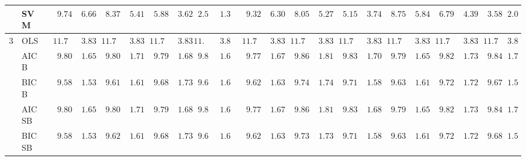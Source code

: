 \begin{tabular}{ll|ll|llllll|llllll|llllll}
 & SVM  & $\phantom{00}9.74$ & $\phantom{00}6.66$ & $\phantom{00}8.37$ & $\phantom{00}5.41$ & $\phantom{00}5.88$ & $\phantom{00}3.62$ & $\phantom{0}2.55$ & $\phantom{0}1.30$ & $\phantom{00}9.32$ & $\phantom{00}6.30$ & $\phantom{00}8.05$ & $\phantom{00}5.27$ & $\phantom{00}5.15$ & $\phantom{00}3.74$ & $\phantom{00}8.75$ & $\phantom{00}5.84$ & $\phantom{00}6.79$ & $\phantom{00}4.39$ & $\phantom{00}3.58$ & $\phantom{0}2.09$ \\\hline
3 & OLS  & $\phantom{0}11.70$ & $\phantom{00}3.83$ & $\phantom{0}11.70$ & $\phantom{00}3.83$ & $\phantom{0}11.70$ & $\phantom{00}3.83$ & $11.70$ & $\phantom{0}3.83$ & $\phantom{0}11.70$ & $\phantom{00}3.83$ & $\phantom{0}11.70$ & $\phantom{00}3.83$ & $\phantom{0}11.70$ & $\phantom{00}3.83$ & $\phantom{0}11.70$ & $\phantom{00}3.83$ & $\phantom{0}11.70$ & $\phantom{00}3.83$ & $\phantom{0}11.70$ & $\phantom{0}3.83$ \\
 & AIC B  & $\phantom{00}9.80$ & $\phantom{00}1.65$ & $\phantom{00}9.80$ & $\phantom{00}1.71$ & $\phantom{00}9.79$ & $\phantom{00}1.68$ & $\phantom{0}9.80$ & $\phantom{0}1.66$ & $\phantom{00}9.77$ & $\phantom{00}1.67$ & $\phantom{00}9.86$ & $\phantom{00}1.81$ & $\phantom{00}9.83$ & $\phantom{00}1.70$ & $\phantom{00}9.79$ & $\phantom{00}1.65$ & $\phantom{00}9.82$ & $\phantom{00}1.73$ & $\phantom{00}9.84$ & $\phantom{0}1.70$ \\
 & BIC B  & $\phantom{00}9.58$ & $\phantom{00}1.53$ & $\phantom{00}9.61$ & $\phantom{00}1.61$ & $\phantom{00}9.68$ & $\phantom{00}1.73$ & $\phantom{0}9.67$ & $\phantom{0}1.60$ & $\phantom{00}9.62$ & $\phantom{00}1.63$ & $\phantom{00}9.74$ & $\phantom{00}1.74$ & $\phantom{00}9.71$ & $\phantom{00}1.58$ & $\phantom{00}9.63$ & $\phantom{00}1.61$ & $\phantom{00}9.72$ & $\phantom{00}1.72$ & $\phantom{00}9.67$ & $\phantom{0}1.55$ \\
 & AIC SB  & $\phantom{00}9.80$ & $\phantom{00}1.65$ & $\phantom{00}9.80$ & $\phantom{00}1.71$ & $\phantom{00}9.79$ & $\phantom{00}1.68$ & $\phantom{0}9.80$ & $\phantom{0}1.66$ & $\phantom{00}9.77$ & $\phantom{00}1.67$ & $\phantom{00}9.86$ & $\phantom{00}1.81$ & $\phantom{00}9.83$ & $\phantom{00}1.68$ & $\phantom{00}9.79$ & $\phantom{00}1.65$ & $\phantom{00}9.82$ & $\phantom{00}1.73$ & $\phantom{00}9.84$ & $\phantom{0}1.70$ \\
 & BIC SB  & $\phantom{00}9.58$ & $\phantom{00}1.53$ & $\phantom{00}9.62$ & $\phantom{00}1.61$ & $\phantom{00}9.68$ & $\phantom{00}1.73$ & $\phantom{0}9.67$ & $\phantom{0}1.60$ & $\phantom{00}9.62$ & $\phantom{00}1.63$ & $\phantom{00}9.73$ & $\phantom{00}1.73$ & $\phantom{00}9.71$ & $\phantom{00}1.58$ & $\phantom{00}9.63$ & $\phantom{00}1.61$ & $\phantom{00}9.72$ & $\phantom{00}1.72$ & $\phantom{00}9.68$ & $\phantom{0}1.56$ \\

\end{tabular}
